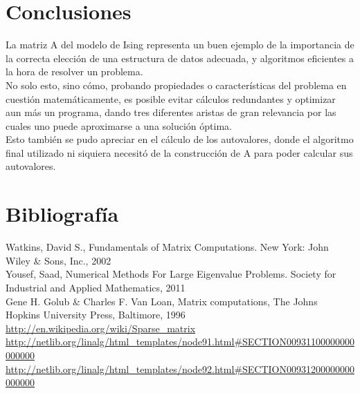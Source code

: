 \documentclass[a4paper,11pt]{article}
\begin{document}
\section{Conclusiones}
La matriz A del modelo de Ising representa un buen ejemplo de la importancia de
la correcta elecci\'on de una estructura de datos adecuada, y algoritmos
eficientes a la hora de resolver un problema.\\
No solo esto, sino c\'omo, probando propiedades o caracter\'isticas del
problema en cuesti\'on matem\'aticamente, es posible evitar cálculos
redundantes y optimizar aun m\'as un programa, dando tres diferentes aristas de
gran relevancia por las cuales uno puede aproximarse a una soluci\'on \'optima.\\
Esto tambi\'en se pudo apreciar en el c\'alculo de los autovalores, donde el
algoritmo final utilizado ni siquiera necesit\'o de la construcci\'on de A para
poder calcular sus autovalores.

\paragraph{}
\section{Bibliograf\'ia}
Watkins, David S., Fundamentals of Matrix Computations. New York: John Wiley \&
Sons, Inc., 2002\\[5pt]
Yousef, Saad, Numerical Methods For Large Eigenvalue Problems. Society for
Industrial and Applied Mathematics, 2011\\[5pt]
Gene H. Golub \& Charles F. Van Loan, Matrix computations, The Johns Hopkins
University Press, Baltimore, 1996\\[5pt]
\url{http://en.wikipedia.org/wiki/Sparse_matrix}\\[5pt]
\url{http://netlib.org/linalg/html_templates/node91.html#SECTION00931100000000000000}\\[5pt]
\url{http://netlib.org/linalg/html_templates/node92.html#SECTION00931200000000000000}\\[5pt]
\end{document}
